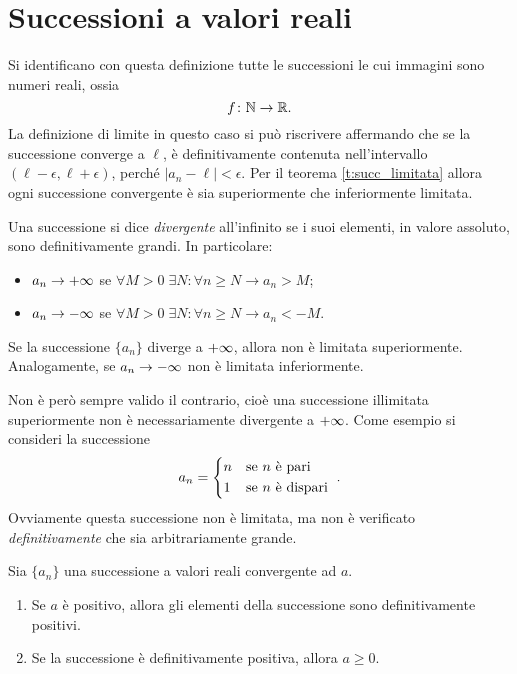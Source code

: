\section{Successioni a valori reali}
Si identificano con questa definizione tutte le successioni le cui immagini sono numeri reali, ossia
\[
f\colon\mathbb{N}\to\mathbb{R}.
\]
La definizione di limite in questo caso si può riscrivere affermando che se la successione converge a $\ell$, è definitivamente contenuta nell'intervallo $(\ell-\epsilon,\ell+\epsilon)$, perché $|a_n-\ell|<\epsilon$.
Per il teorema \ref{t:succ_limitata} allora ogni successione convergente è sia superiormente che inferiormente limitata.

\begin{definizione}
Una successione si dice \emph{divergente} all'infinito se i suoi elementi, in valore assoluto, sono definitivamente grandi. In particolare:
\begin{itemize}
\item $a_n\to +\infty$ se $\forall M>0\;\exists N\colon\forall n\geq N\to a_n>M$;
\item $a_n\to -\infty$ se $\forall M>0\;\exists N\colon\forall n\geq N\to a_n<-M$.
\end{itemize}
\end{definizione}
\begin{teorema}
Se la successione $\{a_n\}$ diverge a $+\infty$, allora non è limitata superiormente. Analogamente, se $a_n\to -\infty$ non è limitata inferiormente.
\end{teorema}
Non è però sempre valido il contrario, cioè una successione illimitata superiormente non è necessariamente divergente a $+\infty$. Come esempio si consideri la successione
\[
a_n=
\begin{cases*}
	n & se $n$ è pari\\
	1 & se $n$ è dispari
\end{cases*}.
\]
Ovviamente questa successione non è limitata, ma non è verificato \emph{definitivamente} che sia arbitrariamente grande.
\begin{teorema}
\label{t:permanenza_segno}
Sia $\{a_n\}$ una successione a valori reali convergente ad $a$.
\begin{enumerate}
\item Se $a$ è positivo, allora gli elementi della successione sono definitivamente positivi.
\item Se la successione è definitivamente positiva, allora $a\geq 0$.
\end{enumerate}
\end{teorema}
